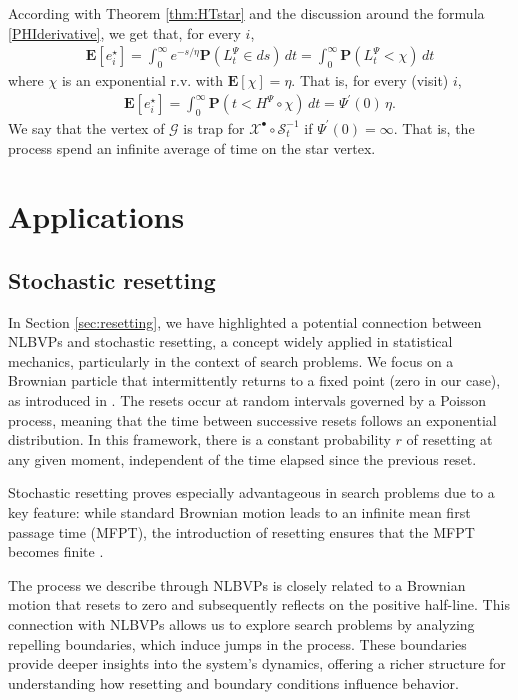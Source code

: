 \documentclass[11pt,a4paper]{article}
\theoremstyle{plain}
\theoremstyle{definition}
\theoremstyle{remark}
\begin{document}
		According with Theorem \ref{thm:HTstar} and the discussion around the formula \eqref{PHIderivative}, we get that, for every $i$,  
		\begin{align}
			\mathbf{E}[e^\star_i] = \int_0^\infty e^{-s/\eta} \mathbf{P}(L^\Psi_t \in ds)\, dt = \int_0^\infty \mathbf{P}(L^\Psi_t < \chi)\, dt
		\end{align}
		where $\chi$ is an exponential r.v. with $\mathbf{E}[\chi] = \eta$. That is, for every (visit) $i$, 
		\begin{align}
			\mathbf{E}[e^\star_i] = \int_0^\infty \mathbf{P}(t < H^\Psi \circ \chi)\, dt = \Psi^\prime(0)\, \eta.
			\label{meanHTgraph}
		\end{align}
		We say that the vertex of $\mathcal{G}$ is trap for $\mathcal{X}^\bullet \circ \mathcal{S}^{-1}_t$ if $\Psi^\prime (0)=\infty$. That is, the process spend an infinite average of time on the star vertex.
		
		
		
		
		
		
		
		
		\section{Applications}
		
		\subsection{Stochastic resetting}
		In Section \ref{sec:resetting}, we have highlighted a potential connection between NLBVPs and stochastic resetting, a concept widely applied in statistical mechanics, particularly in the context of search problems. We focus on a Brownian particle that intermittently returns to a fixed point (zero in our case), as introduced in \cite{resetting1, resetting2}. The resets occur at random intervals governed by a Poisson process, meaning that the time between successive resets follows an exponential distribution. In this framework, there is a constant probability \(r\) of resetting at any given moment, independent of the time elapsed since the previous reset.
		
		Stochastic resetting proves especially advantageous in search problems due to a key feature: while standard Brownian motion leads to an infinite mean first passage time (MFPT), the introduction of resetting ensures that the MFPT becomes finite \cite{resetting1}.
		
		The process we describe through NLBVPs is closely related to a Brownian motion that resets to zero and subsequently reflects on the positive half-line. This connection with NLBVPs allows us to explore search problems by analyzing repelling boundaries, which induce jumps in the process. These boundaries provide deeper insights into the system's dynamics, offering a richer structure for understanding how resetting and boundary conditions influence behavior.
		
\end{document}
